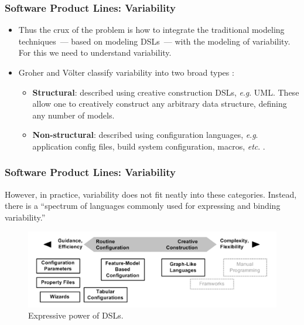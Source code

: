 \documentclass{beamer}
\newcommand{\eg}{\textit{e}.\textit{g}. }
\newcommand{\etc}{\textit{etc}. }
\begin{document}
\begin{frame}
\frametitle{Software Product Lines: Variability}

\begin{itemize}
\item Thus the crux of the problem is how to integrate the traditional
  modeling techniques~--- based on modeling \ac{DSL}s~--- with the
  modeling of variability. For this we need to understand variability.

\pause

\item Groher and V{\"o}lter classify variability into two broad types
  \cite{groher2007expressing}:

\pause

\begin{itemize}
\item \textbf{Structural}: described using creative construction DSLs,
  \eg \ac{UML}. These allow one to creatively construct any arbitrary
  data structure, defining any number of models.

\pause

\item \textbf{Non-structural}: described using configuration
  languages, \eg application config files, build system configuration,
  macros, \etc.

\end{itemize}

\end{itemize}

\end{frame}

\begin{frame}
\frametitle{Software Product Lines: Variability}

However, in practice, variability does not fit neatly into these
categories. Instead, there is a ``spectrum of languages commonly used
for expressing and binding variability.''\cite{groher2007expressing}

\begin{figure}
  \centering
  \includegraphics[scale=0.6]{images/variability_spectrum_voelter.png}
  \caption{Expressive power of \ac{DSL}s.\cite{groher2007expressing}}
\end{figure}

\end{frame}
\end{document}
